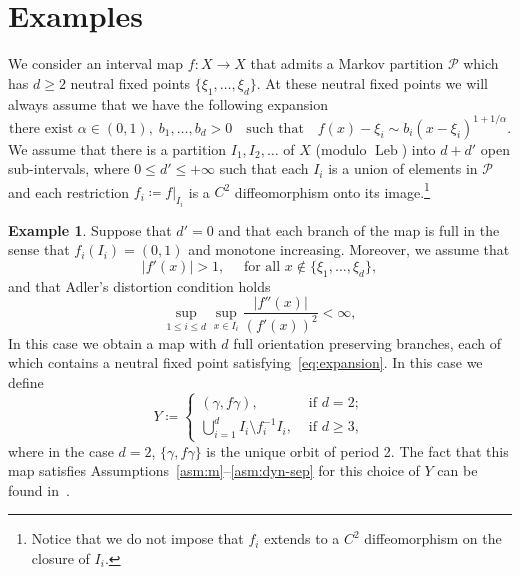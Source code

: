 \documentclass[english, 10pt]{amsart}
\numberwithin{equation}{section}
\theoremstyle{definition}
\theoremstyle{plain}
\theoremstyle{plain}
\theoremstyle{definition}
\theoremstyle{definition}
\newtheorem{example}[definition]{Example}
\theoremstyle{plain}
\theoremstyle{definition}
\newcommand{\Leb}{\operatorname{Leb}}
\newcommand{\cP}{{\mathcal P}}
\newcommand{\eqdef}{\coloneqq}
\numberwithin{equation}{section}
\begin{document}
\section{Examples}
\label{sec:examples}

We consider an interval map $f \colon X \to X$ that admits a Markov partition $\cP$ which has $d\ge 2$ neutral fixed points $\{\xi_1,\ldots, \xi_d\}$. At these neutral fixed points we will always assume that we have the following expansion
\begin{equation}\label{eq:expansion}
  \text{there exist } \alpha \in (0,1), \; b_1,\ldots, b_d > 0
  \quad
  \text{such that}
  \quad
  f (x) - \xi_i
  \sim b_i ( x  - \xi_i )^{ 1 + 1 / \alpha }.
\end{equation}
We assume that there is a partition $I_1,I_2,\ldots$ of $X$ (modulo $\Leb$) into $d + d'$ open sub-intervals, where $0  \le d' \le + \infty$ such that each $I_i$ is a union of elements in $\cP$ and each restriction $f_i \eqdef f|_{I_i}$ is a $C^2$ diffeomorphism onto its image.\footnote{Notice that we do not impose that $f_i$ extends to a $C^2$ diffeomorphism on the closure of $I_i$.}

\begin{example}\label{ex:thaler}
  Suppose that $d' = 0$ and that each branch of the map is full in the sense that $f_i(I_i) = (0,1)$ and monotone increasing. Moreover, we assume that
  \begin{equation}\label{eq:uni-exp}
    | f' (x) |  > 1,\quad\text{ for all } x \not\in \{ \xi_1, \ldots, \xi_d \}
    ,
  \end{equation}
  and that Adler's distortion condition holds
  \begin{equation}\label{eq:adler}
    \sup_{1 \le i \le d} \sup_{x \in I_i} \frac{ |f'' (x)| }{ ( f'(x) )^2 }
    < \infty
    ,
  \end{equation}
  In this case we obtain a map with $d$ full orientation preserving branches, each of which contains a neutral fixed point satisfying~\eqref{eq:expansion}. In this case we define
  \begin{equation}
    Y \eqdef
    \begin{cases}
      (\gamma, f \gamma), &\text{ if } d = 2; \\
      \bigcup_{ i = 1 }^{ d } I_i \setminus f_{i}^{-1} I_i, &
      \text{ if } d \ge 3,
    \end{cases}
  \end{equation}
  where in the case $d = 2$, $\{ \gamma, f \gamma \}$ is the unique orbit of period 2. The fact that this map satisfies Assumptions~\ref{asm:m}--\ref{asm:dyn-sep} for this choice of $Y$ can be found in~\cite[Section 4.1]{CoaMelTal:2024}.
\end{example}
\end{document}
